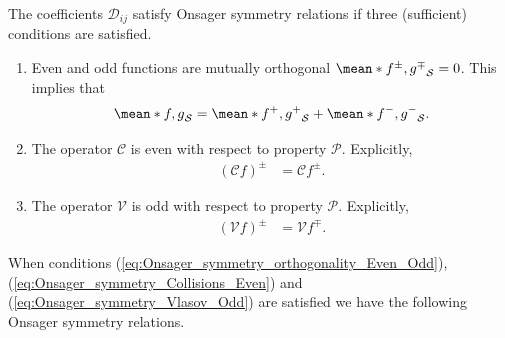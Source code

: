 \documentclass[10pt]{iopart}
\begin{document}
The coefficients $\mathcal{D}_{ij}$ satisfy Onsager symmetry relations if three (sufficient) conditions are satisfied. 
%
\begin{enumerate}
	\item Even and odd functions are mutually orthogonal $\mean*{f^\pm, g^\mp}_\mathcal{S}=0$. This implies that
	\begin{align}
		\mean*{f,g}_{\mathcal{S}} = \mean*{f^+,g^+}_{\mathcal{S}} + \mean*{f^-,g^-}_{\mathcal{S}}.
		\label{eq:Onsager_symmetry_orthogonality_Even_Odd}
	\end{align}
	
	\item The operator $\mathcal{C}$ is even with respect to property $\mathcal{P}$. Explicitly,
	\begin{align}
		(\mathcal{C} f)^\pm & = \mathcal{C} f^\pm.
		\label{eq:Onsager_symmetry_Collisions_Even}
	\end{align}
	
	\item The operator $\mathcal{V}$ is odd with respect to property $\mathcal{P}$. Explicitly,
	\begin{align}
		(\mathcal{V} f)^\pm & = \mathcal{V} f^\mp.
		\label{eq:Onsager_symmetry_Vlasov_Odd}
	\end{align}
\end{enumerate}
When conditions (\ref{eq:Onsager_symmetry_orthogonality_Even_Odd}), (\ref{eq:Onsager_symmetry_Collisions_Even}) and (\ref{eq:Onsager_symmetry_Vlasov_Odd}) are satisfied we have the following Onsager symmetry relations.
%
\end{document}
